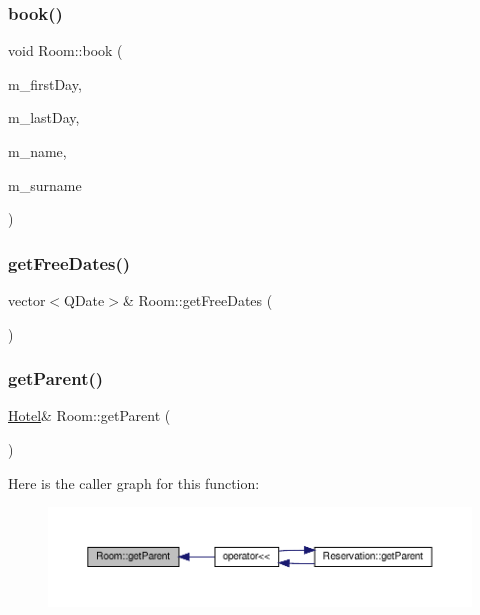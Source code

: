 \mbox{\label{class_room_a01b6361bb54fe5f61cf7c768e60bf6fc}} 
\subsubsection{\texorpdfstring{book()}{book()}}
{\footnotesize\ttfamily void Room\+::book (\begin{DoxyParamCaption}\item[{Q\+Date}]{m\+\_\+first\+Day,  }\item[{Q\+Date}]{m\+\_\+last\+Day,  }\item[{string}]{m\+\_\+name,  }\item[{string}]{m\+\_\+surname }\end{DoxyParamCaption})}

\mbox{\label{class_room_a92a34c55f5109a669b164653d391a5eb}} 
\subsubsection{\texorpdfstring{get\+Free\+Dates()}{getFreeDates()}}
{\footnotesize\ttfamily vector$<$Q\+Date$>$\& Room\+::get\+Free\+Dates (\begin{DoxyParamCaption}{ }\end{DoxyParamCaption})\hspace{0.3cm}{\ttfamily [inline]}}

\mbox{\label{class_room_aa1b182693c0bae407f74fcb2815d1605}} 
\subsubsection{\texorpdfstring{get\+Parent()}{getParent()}}
{\footnotesize\ttfamily \hyperlink{class_hotel}{Hotel}\& Room\+::get\+Parent (\begin{DoxyParamCaption}{ }\end{DoxyParamCaption})\hspace{0.3cm}{\ttfamily [inline]}}

Here is the caller graph for this function\+:\nopagebreak
\begin{figure}[H]
\begin{center}
\leavevmode
\includegraphics[width=350pt]{class_room_aa1b182693c0bae407f74fcb2815d1605_icgraph}
\end{center}
\end{figure}
\mbox{\label{class_room_a10d6dafe0c9e42cfaa19c049e0263d99}} 
